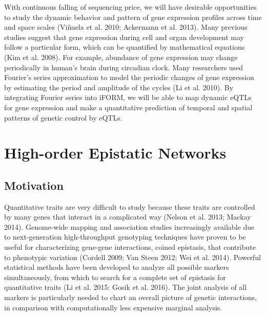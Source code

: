 \documentclass[]{book}
\theoremstyle{definition}
\theoremstyle{definition}
\theoremstyle{remark}
\begin{document}
With continuous falling of sequencing price, we will have desirable
opportunities to study the dynamic behavior and pattern of gene
expression profiles across time and space scales (Viñuela et al. 2010;
Ackermann et al. 2013). Many previous studies suggest that gene
expression during cell and organ development may follow a particular
form, which can be quantified by mathematical equations (Kim et al.
2008). For example, abundance of gene expression may change periodically
in human's brain during circadian clock. Many researchers used Fourier's
series approximation to model the periodic changes of gene expression by
estimating the period and amplitude of the cycles (Li et al. 2010). By
integrating Fourier series into iFORM, we will be able to map dynamic
eQTLs for gene expression and make a quantitative prediction of temporal
and spatial patterns of genetic control by eQTLs.

\chapter{High-order Epistatic
Networks}\label{high-order-epistatic-networks}

\section{Motivation}\label{motivation-1}

Quantitative traits are very difficult to study because these traits are
controlled by many genes that interact in a complicated way (Nelson et
al. 2013; Mackay 2014). Genome-wide mapping and association studies
increasingly available due to next-generation high-throughput genotyping
techniques have proven to be useful for characterizing gene-gene
interactions, coined epistasis, that contribute to phenotypic variation
(Cordell 2009; Van Steen 2012; Wei et al. 2014). Powerful statistical
methods have been developed to analyze all possible markers
simultaneously, from which to search for a complete set of epistasis for
quantitative traits (Li et al. 2015: Gosik et al. 2016). The joint
analysis of all markers is particularly needed to chart an overall
picture of genetic interactions, in comparison with computationally less
expensive marginal analysis.
\end{document}
